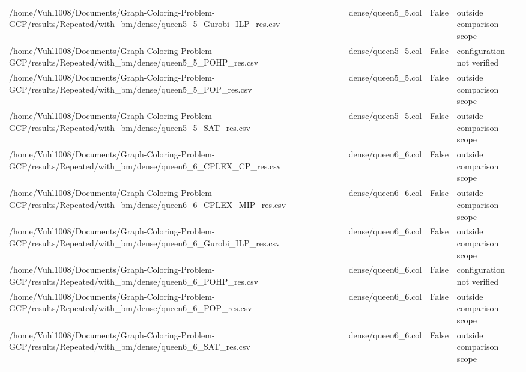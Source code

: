 \begin{table}[htbp]
\begin{tabular}{llll}
/home/Vuhl1008/Documents/Graph-Coloring-Problem-GCP/results/Repeated/with\_bm/dense/queen5\_5\_Gurobi\_ILP\_res.csv & dense/queen5\_5.col & False & outside comparison scope \\
/home/Vuhl1008/Documents/Graph-Coloring-Problem-GCP/results/Repeated/with\_bm/dense/queen5\_5\_POHP\_res.csv & dense/queen5\_5.col & False & configuration not verified \\
/home/Vuhl1008/Documents/Graph-Coloring-Problem-GCP/results/Repeated/with\_bm/dense/queen5\_5\_POP\_res.csv & dense/queen5\_5.col & False & outside comparison scope \\
/home/Vuhl1008/Documents/Graph-Coloring-Problem-GCP/results/Repeated/with\_bm/dense/queen5\_5\_SAT\_res.csv & dense/queen5\_5.col & False & outside comparison scope \\
/home/Vuhl1008/Documents/Graph-Coloring-Problem-GCP/results/Repeated/with\_bm/dense/queen6\_6\_CPLEX\_CP\_res.csv & dense/queen6\_6.col & False & outside comparison scope \\
/home/Vuhl1008/Documents/Graph-Coloring-Problem-GCP/results/Repeated/with\_bm/dense/queen6\_6\_CPLEX\_MIP\_res.csv & dense/queen6\_6.col & False & outside comparison scope \\
/home/Vuhl1008/Documents/Graph-Coloring-Problem-GCP/results/Repeated/with\_bm/dense/queen6\_6\_Gurobi\_ILP\_res.csv & dense/queen6\_6.col & False & outside comparison scope \\
/home/Vuhl1008/Documents/Graph-Coloring-Problem-GCP/results/Repeated/with\_bm/dense/queen6\_6\_POHP\_res.csv & dense/queen6\_6.col & False & configuration not verified \\
/home/Vuhl1008/Documents/Graph-Coloring-Problem-GCP/results/Repeated/with\_bm/dense/queen6\_6\_POP\_res.csv & dense/queen6\_6.col & False & outside comparison scope \\
/home/Vuhl1008/Documents/Graph-Coloring-Problem-GCP/results/Repeated/with\_bm/dense/queen6\_6\_SAT\_res.csv & dense/queen6\_6.col & False & outside comparison scope \\
\hline
\end{tabular}
\end{table}

